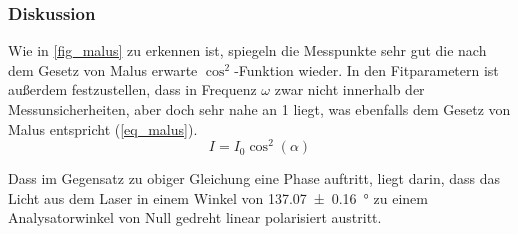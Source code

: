 \documentclass[
	a4paper,
	12pt,
	pagesize,
	ngerman
]{scrartcl}
\begin{document}
			\subsubsection*{Diskussion}

			Wie in \cref{fig_malus} zu erkennen ist, spiegeln die Messpunkte sehr gut die nach dem Gesetz von Malus erwarte $\cos ^2$-Funktion wieder.
			In den Fitparametern ist außerdem festzustellen, dass in Frequenz $\omega$ zwar nicht innerhalb der Messunsicherheiten, aber doch sehr nahe an \num{1} liegt, was ebenfalls dem Gesetz von Malus entspricht (\cref{eq_malus}).
			\begin{equation}
				I = I_0 \cos^2(\alpha)
			\end{equation}

			Dass im Gegensatz zu obiger Gleichung eine Phase auftritt, liegt darin, dass das Licht aus dem Laser in einem Winkel von \SI{137,07\pm 0.16}{\degree} zu einem Analysatorwinkel von Null gedreht linear polarisiert austritt.
\end{document}
